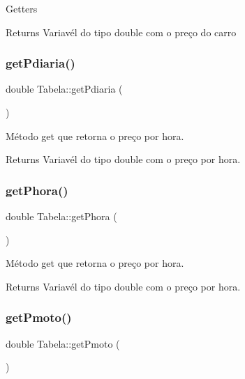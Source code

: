 Getters \begin{DoxyReturn}{Returns}
Variavél do tipo double com o preço do carro 
\end{DoxyReturn}
\mbox{\label{classTabela_a7b8a7868ae2097482d8c9c1755fce914}} 
\subsubsection{\texorpdfstring{get\+Pdiaria()}{getPdiaria()}}
{\footnotesize\ttfamily double Tabela\+::get\+Pdiaria (\begin{DoxyParamCaption}{ }\end{DoxyParamCaption})}



Método get que retorna o preço por hora. 

\begin{DoxyReturn}{Returns}
Variavél do tipo double com o preço por hora. 
\end{DoxyReturn}
\mbox{\label{classTabela_a888b02d9fb45421a2574161c3c83e6db}} 
\subsubsection{\texorpdfstring{get\+Phora()}{getPhora()}}
{\footnotesize\ttfamily double Tabela\+::get\+Phora (\begin{DoxyParamCaption}{ }\end{DoxyParamCaption})}



Método get que retorna o preço por hora. 

\begin{DoxyReturn}{Returns}
Variavél do tipo double com o preço por hora. 
\end{DoxyReturn}
\mbox{\label{classTabela_a6f65feced705027c6c4d695737e1f7f4}} 
\subsubsection{\texorpdfstring{get\+Pmoto()}{getPmoto()}}
{\footnotesize\ttfamily double Tabela\+::get\+Pmoto (\begin{DoxyParamCaption}{ }\end{DoxyParamCaption})}



